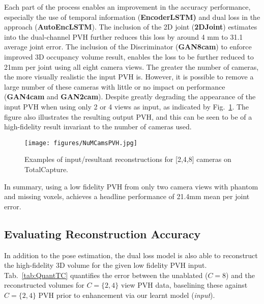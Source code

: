 \documentclass{bmvc2k}
\newcommand{\squeezeup}{\vspace{-2mm}}
\begin{document}
Each part of the process enables an improvement in the accuracy performance, especially the use of temporal information (\textbf{EncoderLSTM)} and dual loss in the approach (\textbf{AutoEncLSTM}). The inclusion of the 2D joint (\textbf{2DJoint}) estimates into the dual-channel PVH further reduces this loss by around 4 mm to 31.1 average joint error. The inclusion of the Discriminator (\textbf{GAN8cam}) to enforce improved 3D occupancy volume result, enables the loss to be further reduced to 21mm per joint using all eight camera views. The greater the number of cameras, the more visually realistic the input PVH is. However, it is possible to remove a large number of these cameras with little or no impact on performance (\textbf{GAN4cam} and \textbf{GAN2cam}). Despite greatly degrading the appearance of the input PVH when using only 2 or 4 views as input, as indicated by Fig.~\ref{fig:NuMCamsPVH}. The figure also illustrates the resulting output PVH, and this can be seen to be of a high-fidelity result invariant to the number of cameras used.
\begin{figure}[t!]
\centering
\texttt{[image: figures/NuMCamsPVH.jpg]}
\caption{Examples of input/resultant reconstructions for [2,4,8] cameras on TotalCapture.}
\label{fig:NuMCamsPVH}
\squeezeup
\squeezeup
\end{figure}
In summary, using a low fidelity PVH  from only two camera views with phantom and missing voxels, achieves a headline performance of 21.4mm mean per joint error.


\subsection{Evaluating Reconstruction Accuracy}

In addition to the pose estimation, the dual loss model is also able to reconstruct the high-fidelity 3D volume for the given low fidelity PVH input. Tab.~\ref{tab:QuantTC} quantifies the error between the unablated ($C=8$) and the reconstructed volumes for $C=\{2,4\}$ view PVH data, baselining these against $C=\{2,4\}$ PVH prior to enhancement via our learnt model (\emph{input}). 
\end{document}
